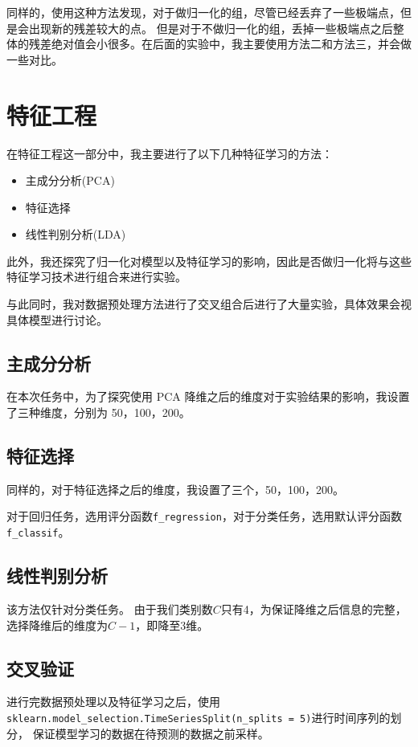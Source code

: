 \documentclass[12pt, a4paper, oneside]{ctexart}
\begin{document}
同样的，使用这种方法发现，对于做归一化的组，尽管已经丢弃了一些极端点，但是会出现新的残差较大的点。
但是对于不做归一化的组，丢掉一些极端点之后整体的残差绝对值会小很多。在后面的实验中，我主要使用方法二和方法三，并会做一些对比。

\section{特征工程}
在特征工程这一部分中，我主要进行了以下几种特征学习的方法：
\begin{itemize}
    \item 主成分分析(PCA)
    \item 特征选择
    \item 线性判别分析(LDA)
\end{itemize}

此外，我还探究了归一化对模型以及特征学习的影响，因此是否做归一化将与这些特征学习技术进行组合来进行实验。

与此同时，我对数据预处理方法进行了交叉组合后进行了大量实验，具体效果会视具体模型进行讨论。

\subsection{主成分分析}
在本次任务中，为了探究使用 PCA 降维之后的维度对于实验结果的影响，我设置了三种维度，分别为 50，100，200。

\subsection{特征选择}
同样的，对于特征选择之后的维度，我设置了三个，50，100，200。

对于回归任务，选用评分函数\texttt{f\_regression}，对于分类任务，选用默认评分函数\texttt{f\_classif}。

\subsection{线性判别分析}
该方法仅针对分类任务。
由于我们类别数$C$只有4，为保证降维之后信息的完整，选择降维后的维度为$C - 1$，即降至3维。

\subsection{交叉验证}
进行完数据预处理以及特征学习之后，使用\texttt{sklearn.model\_selection.TimeSeriesSplit(n\_splits = 5)}进行时间序列的划分，
保证模型学习的数据在待预测的数据之前采样。
\end{document}
